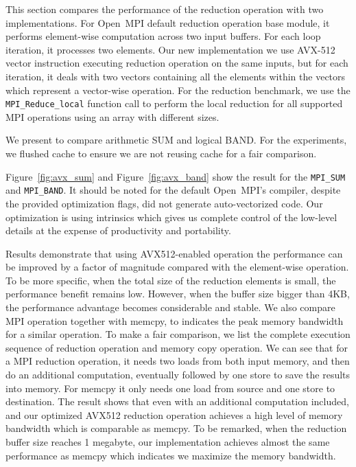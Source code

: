 \documentclass[sigconf]{acmart}
\newcommand{\mpifunc}[1]{\lstinline"MPI_#1"\xspace}
\newcommand{\ompi}[0]{Open~MPI\xspace}
\newcommand{\mpi}[0]{\textsc{MPI}\xspace}
\begin{document}
This section compares the performance of the reduction operation with two
implementations.
For \ompi default reduction operation base module, it
performs element-wise computation across two input buffers. For each loop iteration,
it processes two elements. Our new implementation we use AVX-512 vector instruction
executing reduction operation on the same inputs, but for each iteration, it
deals with two vectors containing all the elements within the vectors which represent
a vector-wise operation.
For the reduction benchmark, we use the \mpifunc{Reduce_local} function call to
perform the local reduction for all supported MPI operations using an array with different sizes.

We present to compare arithmetic SUM and logical BAND.
For the experiments, we flushed cache to ensure we are not reusing cache for a fair comparison.

Figure~\ref{fig:avx_sum} and Figure~\ref{fig:avx_band} show the result for the
\mpifunc{SUM} and \mpifunc{BAND}.
It should be noted for the default \ompi's compiler, despite the
provided optimization flags, did not generate auto-vectorized
code. Our optimization is using intrinsics which gives us complete
control of the low-level details at the expense of productivity and
portability.

Results demonstrate that using AVX512-enabled operation the
performance can be improved by a factor of magnitude compared with the
element-wise operation.  To be more specific, when the total size of
the reduction elements is small, the performance benefit remains low.
%
However, when the buffer size bigger than 4KB, the performance
advantage becomes considerable and stable.  We also compare MPI
operation together with memcpy, to indicates the peak memory bandwidth
for a similar operation.  To make a fair comparison, we list the
complete execution sequence of reduction operation and memory copy
operation.  We can see that for a \mpi reduction operation, it needs
two loads from both input memory, and then do an additional
computation, eventually followed by one store to save the results into
memory. For memcpy it only needs one load from source and one store to
destination.  The result shows that even with an additional
computation included, and our optimized AVX512 reduction operation
achieves a high level of memory bandwidth which is comparable as
memcpy.  To be remarked, when the reduction buffer size reaches 1
megabyte, our implementation achieves almost the same performance as
memcpy which indicates we maximize the memory bandwidth.
\end{document}
